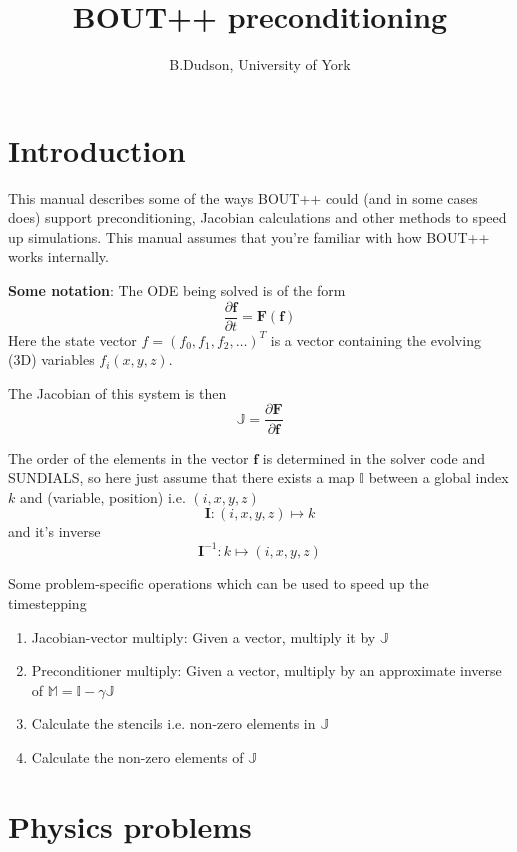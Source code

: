 \documentclass[12pt]{article}
\newcommand{\deriv}[2]{\ensuremath{\frac{\partial #1}{\partial #2}}}
\newcommand{\Vec}[1]{\ensuremath{\mathbf{#1}}}
\newcommand{\Jac}{\ensuremath{\mathbb{J}}}
\begin{document}
\title{BOUT++ preconditioning}
\author{B.Dudson, University of York}

\maketitle

\tableofcontents

\section{Introduction}

This manual describes some of the ways BOUT++ could (and in some cases does)
support preconditioning, Jacobian calculations and other methods to speed up
simulations. This manual assumes that you're familiar with how BOUT++ works
internally.

{\bf Some notation}: The ODE being solved is of the form
\[
\deriv{\Vec{f}}{t} = \Vec{F}\left(\Vec{f}\right)
\]
Here the state vector $f = \left(f_0, f_1, f_2, \ldots\right)^T$ is a vector
containing the evolving (3D) variables $f_i\left(x,y,z\right)$.

The Jacobian of this system is then
\[
\Jac = \deriv{\Vec{F}}{\Vec{f}}
\]

The order of the elements in the vector $\Vec{f}$ is determined in the
solver code and SUNDIALS, so here just assume that there exists a
map $\mathbb{I}$ between a global index $k$ and (variable, position) i.e. $\left(i,x,y,z\right)$
\[
\mathbf{I} : \left(i,x,y,z\right) \mapsto k
\]
and it's inverse
\[
\mathbf{I}^{-1} : k \mapsto \left(i,x,y,z\right)
\]

Some problem-specific operations which can be used to speed up the timestepping
\begin{enumerate}
\item Jacobian-vector multiply: Given a vector, multiply it by $\Jac$
\item Preconditioner multiply: Given a vector, multiply by an approximate
  inverse of $\mathbb{M} = \mathbb{I} - \gamma\mathbb{J}$
\item Calculate the stencils i.e. non-zero elements in $\Jac$
\item Calculate the non-zero elements of $\Jac$
\end{enumerate}

\section{Physics problems}
\end{document}
